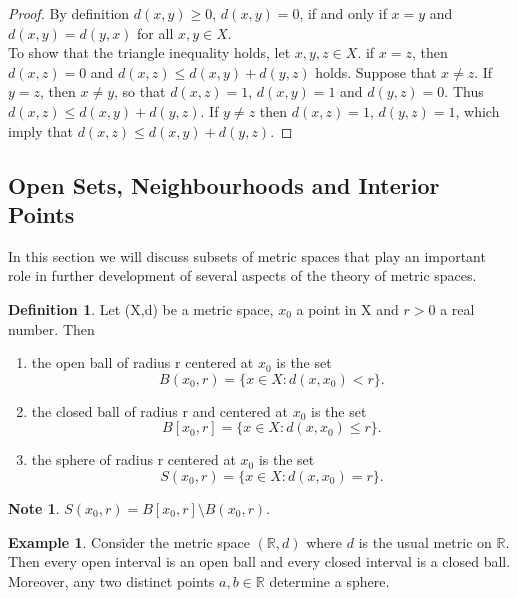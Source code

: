 \documentclass[11pt,a4paper]{article}
\theoremstyle{definition}
\newtheorem{defn}[thm]{Definition}
\newtheorem{exa}[thm]{Example}
\newtheorem*{note}{Note}
\begin{document}
\begin{proof}
By definition $d(x,y)\geq 0$, $d(x,y)=0$, if and only if $x=y$ and $d(x,y)=d(y,x)$ for all $x,y\in X$.\\ To show that the triangle inequality holds, let $x, y,z\in X$. if $x=z$, then $d(x,z)=0$ and $d(x,z)\leq d(x,y)+d(y,z)$ holds. Suppose that $x\neq z$. If $y=z$, then $x\neq y$, so that $d(x,z)=1$, $d(x,y)=1$ and $d(y,z)=0$. Thus $d(x,z)\leq d(x,y)+d(y,z)$. If $y\neq z$ then $d(x,z)=1$, $d(y,z)=1$, which imply that $d(x,z)\leq d(x,y)+d(y,z)$.
\end{proof}












\subsection{Open Sets, Neighbourhoods and Interior Points}
In this section we will discuss subsets of metric spaces that play an important role in further development of several aspects of the theory of metric spaces.



\begin{defn}
Let (X,d) be a metric space, $x_0$ a point in X and $r>0$ a real number. Then
\begin{enumerate}
\item[i] the open ball of radius r centered at $x_0$ is the set $$B(x_0,r)=\{x\in X:d(x,x_0)<r\}.$$
\item[ii] the closed ball of radius r and centered at $x_0$ is the set $$B[x_0,r]=\{x\in X:d(x,x_0)\leq r\}.$$
\item[iii] the sphere of radius r centered at $x_0$ is the set $$S(x_0,r)=\{x\in X:d(x,x_0)=r\}.$$
\end{enumerate}
\end{defn}



\begin{note}
$S(x_0,r)=B[x_0,r]\setminus B(x_0,r)$.
\end{note}





\begin{exa}
Consider the metric space $(\mathbb{R},d)$ where $d$ is the usual metric on $\mathbb{R}$. Then every open interval is an open ball and every closed interval is a closed ball. Moreover, any two distinct points $a,b\in \mathbb{R}$ determine a sphere.
\end{exa}
\end{document}
